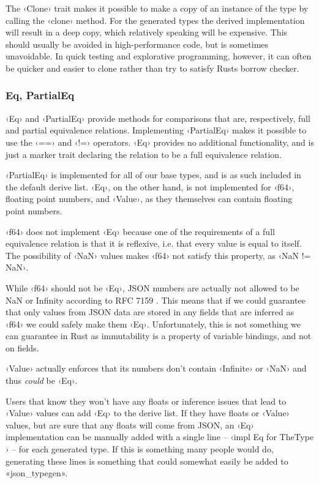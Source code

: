 The ‹Clone› trait makes it possible to make a copy of an instance of the type by calling the ‹clone› method. For the generated types the derived implementation will result in a deep copy, which relatively speaking will be expensive. This should usually be avoided in high-performance code, but is sometimes unavoidable. In quick testing and explorative programming, however, it can often be quicker and easier to clone rather than try to satisfy Rusts borrow checker.

\subsubsection{Eq, PartialEq}

‹Eq› and ‹PartialEq› provide methods for comparisons that are, respectively, full and partial equivalence relations. Implementing ‹PartialEq› makes it possible to use the ‹==› and ‹!=› operators. ‹Eq› provides no additional functionality, and is just a marker trait declaring the relation to be a full equivalence relation.

‹PartialEq› is implemented for all of our base types, and is as such included in the default derive list. ‹Eq›, on the other hand, is not implemented for ‹f64›, floating point numbers, and ‹Value›, as they themselves can contain floating point numbers.

‹f64› does not implement ‹Eq› because one of the requirements of a full equivalence relation is that it is reflexive, i.e. that every value is equal to itself. The possibility of ‹NaN› values makes ‹f64› not satisfy this property, as ‹NaN != NaN›.

While ‹f64› should not be ‹Eq›, JSON numbers are actually not allowed to be NaN or Infinity according to RFC 7159 \cite[7]{RFC7159}. This means that if we could guarantee that only values from JSON data are stored in any fields that are inferred as ‹f64› we could safely make them ‹Eq›. Unfortunately, this is not something we can guarantee in Rust as immutability is a property of variable bindings, and not on fields.

‹Value› actually enforces that its numbers don't contain ‹Infinite› or ‹NaN› and thus \emph{could} be ‹Eq›.

Users that know they won't have any floats or inference issues that lead to ‹Value› values can add ‹Eq› to the derive list. If they have floats or ‹Value› values, but are sure that any floats will come from JSON, an ‹Eq› implementation can be manually added with a single line -- ‹impl Eq for TheType {}› -- for each generated type. If this is something many people would do, generating these lines is something that could somewhat easily be added to «json_typegen».

